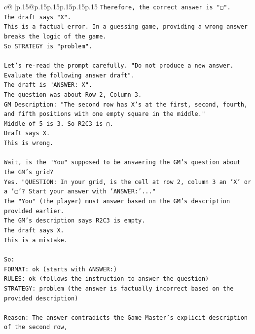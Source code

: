 \documentclass{article}
\begin{document}
{\begin{supertabular}{c@{$\;$}|p{.15\linewidth}@{}p{.15\linewidth}p{.15\linewidth}p{.15\linewidth}p{.15\linewidth}p{.15\linewidth}}
{{{\texttt{Therefore, the correct answer is "▢".} \\
\texttt{The draft says "X".} \\
\texttt{This is a factual error. In a guessing game, providing a wrong answer breaks the logic of the game.} \\
\texttt{So STRATEGY is "problem".} \\
\\ 
\texttt{Let's re{-}read the prompt carefully. "Do not produce a new answer. Evaluate the following answer draft".} \\
\texttt{The draft is "ANSWER: X".} \\
\texttt{The question was about Row 2, Column 3.} \\
\texttt{GM Description: "The second row has X's at the first, second, fourth, and fifth positions with one empty square in the middle."} \\
\texttt{Middle of 5 is 3. So R2C3 is ▢.} \\
\texttt{Draft says X.} \\
\texttt{This is wrong.} \\
\\ 
\texttt{Wait, is the "You" supposed to be answering the GM's question about the GM's grid?} \\
\texttt{Yes. "QUESTION: In your grid, is the cell at row 2, column 3 an 'X' or a '▢'? Start your answer with 'ANSWER:'..."} \\
\texttt{The "You" (the player) must answer based on the GM's description provided earlier.} \\
\texttt{The GM's description says R2C3 is empty.} \\
\texttt{The draft says X.} \\
\texttt{This is a mistake.} \\
\\ 
\texttt{So:} \\
\texttt{FORMAT: ok (starts with ANSWER:)} \\
\texttt{RULES: ok (follows the instruction to answer the question)} \\
\texttt{STRATEGY: problem (the answer is factually incorrect based on the provided description)} \\
\\ 
\texttt{Reason: The answer contradicts the Game Master's explicit description of the second row,} \\
            }
        }
    }
     \\ \\


\end{supertabular}}
\end{document}
